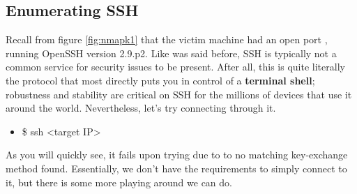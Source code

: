 \documentclass[a4paper,11pt]{article}
\renewcommand{\tt}[2][tt]{\textcolor{#1}{\ttfamily #2}}%
\begin{document}
\subsection{Enumerating SSH}


Recall from figure \ref{fig:nmapk1} that the victim machine had an open port \tt{22}, running OpenSSH version 2.9.p2. Like was said before, SSH is typically not a common service for security issues to be present. After all, this is quite literally the protocol that most directly puts you in control of a {\bfseries terminal shell}; robustness and stability are critical on SSH for the millions of devices that use it around the world. Nevertheless, let's try connecting through it.
\begin{itemize}
    \item \tt{\$ ssh <target IP>}
\end{itemize}
As you will quickly see, it fails upon trying due to to \tt{no matching key-exchange method found}. Essentially, we don't have the requirements to simply connect to it, but there is some more playing around we can do.
\pagebreak
\end{document}
